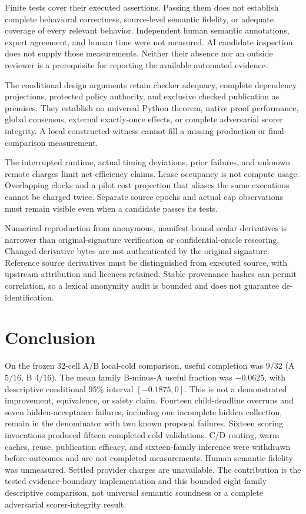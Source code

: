 \documentclass{article}
\begin{document}
Finite tests cover their executed assertions. Passing them does not establish
complete behavioral correctness, source-level semantic fidelity, or adequate
coverage of every relevant behavior. Independent human semantic annotations,
expert agreement, and human time were not measured. AI candidate inspection
does not supply those measurements. Neither their absence nor an outside
reviewer is a prerequisite for reporting the available automated evidence.

The conditional design arguments retain checker adequacy, complete dependency
projections, protected policy authority, and exclusive checked publication as
premises. They establish no universal Python theorem, native proof performance,
global consensus, external exactly-once effects, or complete adversarial scorer
integrity. A local constructed witness cannot fill a missing production or
final-comparison measurement.

The interrupted runtime, actual timing deviations, prior failures, and unknown
remote charges limit net-efficiency claims. Lease occupancy is not compute
usage. Overlapping clocks and a pilot cost projection that aliases the same
executions cannot be charged twice. Separate source epochs and actual cap
observations must remain visible even when a candidate passes its tests.

Numerical reproduction from anonymous, manifest-bound scalar derivatives is
narrower than original-signature verification or confidential-oracle rescoring.
Changed derivative bytes are not authenticated by the original signature.
Reference source derivatives must be distinguished from executed source, with
upstream attribution and licences retained. Stable provenance hashes can permit
correlation, so a lexical anonymity audit is bounded and does not guarantee
de-identification.

\section{Conclusion}
\label{sec:conclusion}

On the frozen 32-cell A/B local-cold comparison, useful completion was $9/32$
(A $5/16$, B $4/16$). The mean family B-minus-A useful fraction was $-0.0625$,
with descriptive conditional 95\% interval $[-0.1875,0]$. This is not a
demonstrated improvement, equivalence, or safety claim. Fourteen
child-deadline overruns and seven hidden-acceptance failures, including one
incomplete hidden collection, remain in the denominator with two known
proposal failures. Sixteen scoring invocations produced fifteen completed
cold validations. C/D routing, warm caches, reuse, publication efficacy, and
sixteen-family inference were withdrawn before outcomes and are not completed
measurements. Human semantic fidelity was unmeasured. Settled provider charges
are unavailable. The contribution is the tested evidence-boundary
implementation and this bounded eight-family descriptive comparison, not
universal semantic soundness or a complete adversarial scorer-integrity
result.
\end{document}
